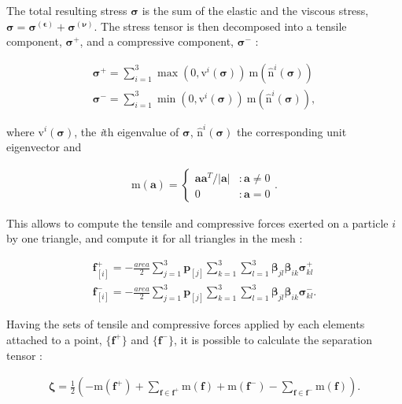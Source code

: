 \documentclass[tog]{acmsiggraph}
\begin{document}
The total resulting stress $\pmb{\sigma}$ is the sum of the elastic and the viscous stress, $\pmb{\sigma} = \pmb{\sigma^{(\epsilon)}} + \pmb{\sigma^{(\nu)}}$. The stress tensor is then decomposed into a tensile component, $\pmb{\sigma}^+$, and a compressive component, $\pmb{\sigma}^-$ : 

\begin{gather}
\pmb{\sigma}^+ = \sum_{i=1}^3 \max (0, \mathrm{v}^i(\pmb{\sigma})) \ \pmb{\mathrm{m}}(\pmb{\hat{\mathrm{n}}}^i(\pmb{\sigma}))\\
\pmb{\sigma}^- = \sum_{i=1}^3 \min (0, \mathrm{v}^i(\pmb{\sigma})) \ \pmb{\mathrm{m}}(\pmb{\hat{\mathrm{n}}}^i(\pmb{\sigma})),
\end{gather}

where $\mathrm{v}^i(\pmb{\sigma})$, the \textit{i}th eigenvalue of $\pmb{\sigma}$, $\pmb{\hat{\mathrm{n}}}^i(\pmb{\sigma})$ the corresponding unit eigenvector and 

\begin{gather}
\pmb{\mathrm{m}(a)} =
\begin{cases}
\pmb{aa}^T/|\pmb{a}| & : \pmb{a} \neq 0\\
0 & : \pmb{a} = 0
\end{cases}.
\end{gather}


This allows to compute the tensile and compressive forces exerted on a particle $i$ by one triangle, and compute it for all triangles in the mesh : 

\begin{gather}
\label{eqfp} \pmb{f}_{[i]}^{+} = -\frac{area}{2}\sum_{j = 1}^3 \pmb{p}_{[j]}\sum_{k=1}^3 \sum_{l=1}^3 \pmb{\beta}_{jl} \pmb{\beta}_{ik} \pmb{\sigma}_{kl}^{+}\\
\label{eqfm} \pmb{f}_{[i]}^{-} = -\frac{area}{2}\sum_{j = 1}^3 \pmb{p}_{[j]}\sum_{k=1}^3 \sum_{l=1}^3 \pmb{\beta}_{jl} \pmb{\beta}_{ik} \pmb{\sigma}_{kl}^{-}.
\end{gather}

Having the sets of tensile and compressive forces applied by each elements attached to a point, $\{\pmb{f}^+\}$ and $\{\pmb{f}^-\}$, it is possible to calculate the separation tensor :

\begin{gather}
\pmb{\zeta} = \frac{1}{2}\left(-\pmb{\mathrm{m}}(\pmb{f}^+) + \sum_{\pmb{f} \in {\pmb{f}^+}} \pmb{\mathrm{m}}(\pmb{f}) +\pmb{\mathrm{m}}(\pmb{f}^-) - \sum_{\pmb{f} \in {\pmb{f}^-}} \pmb{\mathrm{m}}(\pmb{f}) \right).
\end{gather}
\end{document}
